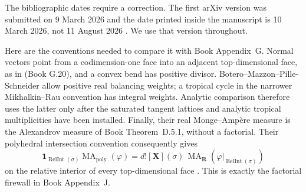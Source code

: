 \documentclass[11pt,a4paper]{article}
\theoremstyle{definition}
\theoremstyle{remark}
\newcommand{\one}{\mathbf 1}
\DeclareMathOperator{\RelInt}{RelInt}
\DeclareMathOperator{\MA}{MA}
\begin{document}
The bibliographic dates require a correction.  The first arXiv version was
submitted on 9 March 2026 and the date printed inside the manuscript is
10 March 2026, not 11 August 2026 \cite{BMPS26}.  We use that version
throughout.

Here are the conventions needed to compare it with
Book Appendix~G.  Normal vectors point from a codimension-one
face into an adjacent top-dimensional face, as in
\textup{(Book G.20)}, and a convex bend has positive divisor.
Botero--Mazzon--Pille-Schneider allow positive real balancing weights; a
tropical cycle in the narrower Mikhalkin--Rau convention has integral
weights.  Analytic comparison therefore uses the latter only after the
saturated tangent lattices and analytic tropical multiplicities have been
installed.  Finally, their real Monge--Amp\`ere measure is the Alexandrov
measure of Book Theorem~D.5.1, without a factorial.  Their
polyhedral intersection convention consequently gives
\begin{equation}
 \one_{\RelInt(\sigma)}\MA_{\mathrm{poly}}(\varphi)
 =d![\mathbf X](\sigma)\,
   \MA_{\mathbf R}(\varphi|_{\RelInt(\sigma)})
 \label{eq:frontier-polyhedral-real-local}
\end{equation}
on the relative interior of every top-dimensional face
\cite[Propositions~4.12 and~4.20]{BMPS26}.  This is exactly the factorial
firewall in Book Appendix~J.
\end{document}

